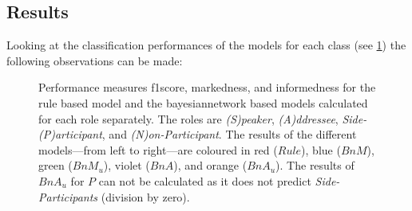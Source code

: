 \subsection{Results}

Looking at the classification performances of the models for each class (see \cref{fig:role-ev-classwise}) the following observations can be made:
\begin{figure}[htb]
    \centering
    \begin{small}
    
    \end{small}
    \caption[Class-wise performance of simple models.]{\label{fig:role-ev-classwise}
    Performance measures \gls{f1score}, \gls{markedness}, and \gls{informedness} for the rule based model and the \gls{bayesiannetwork} based models calculated for each role separately.
    The roles are \emph{(S)peaker}, \emph{(A)ddressee}, \emph{Side-(P)articipant}, and \emph{(N)on-Participant}.
    The results of the different models---from left to right---are coloured in red (\(Rule\)), blue (\(BnM\)), green (\(BnM_u\)), violet (\(BnA\)), and orange (\(BnA_u\)).
    The results of \(BnA_u\) for \(P\) can not be calculated as it does not predict \emph{Side-Participants} (division by zero).
    }
\end{figure}
